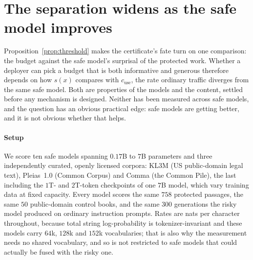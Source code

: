 
\section{The separation widens as the safe model improves}\label{sec:scaling}

Proposition~\ref{prop:threshold} makes the certificate's fate turn on one comparison: the budget
against the safe model's surprisal of the protected work. Whether a deployer can pick a budget that
is both informative and generous therefore depends on how $s(x)$ compares with $c_{\mathrm{use}}$,
the rate ordinary traffic diverges from the same safe model. Both are properties of the models and
the content, settled before any mechanism is designed. Neither has been measured across safe models,
and the question has an obvious practical edge: safe models are getting better, and it is not
obvious whether that helps.

\paragraph{Setup}
We score ten safe models spanning $0.17$B to $7$B parameters and three independently curated,
openly licensed corpora: KL3M (US public-domain legal text), Pleias~1.0 (Common Corpus) and Comma
(the Common Pile), the last including the $1$T- and $2$T-token checkpoints of one $7$B model, which
vary training data at fixed capacity. Every model scores the same $758$ protected passages, the
same $50$ public-domain control books, and the same $300$ generations the risky model produced on
ordinary instruction prompts. Rates are nats per character throughout, because total string
log-probability is tokenizer-invariant and these models carry $64$k, $128$k and $152$k
vocabularies; that is also why the measurement needs no shared vocabulary, and so is not restricted
to safe models that could actually be fused with the risky one.

